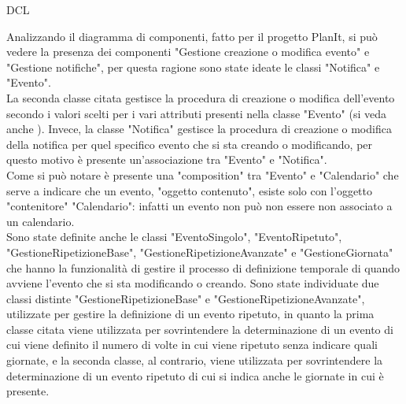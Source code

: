 \begin{listaPersonale}{DCL}
\begin{listaPersonale2}[DCL]{}
        \begin{center}
            
        \end{center}


        Analizzando il diagramma di componenti, fatto per il progetto PlanIt, si può vedere la presenza dei componenti "Gestione creazione o modifica evento" e "Gestione notifiche", per questa ragione sono state ideate le classi "Notifica" e "Evento". \\
        La seconda classe citata gestisce la procedura di creazione o modifica dell'evento secondo i valori scelti per i vari attributi presenti nella classe "Evento" (si veda anche ). Invece, la classe "Notifica" gestisce la procedura di creazione o modifica della notifica per quel specifico evento che si sta creando o modificando, per questo motivo è presente un'associazione tra "Evento" e "Notifica".\\
        Come si può notare è presente una "composition" tra "Evento" e "Calendario" che serve a indicare che un evento, "oggetto contenuto", esiste solo con l'oggetto "contenitore" "Calendario": infatti un evento non può non essere non associato a un calendario.\\
        Sono state definite anche le classi "EventoSingolo", "EventoRipetuto", "GestioneRipetizioneBase", "GestioneRipetizioneAvanzate" e "GestioneGiornata" che hanno la funzionalità di gestire il processo di definizione temporale di quando avviene l'evento che si sta modificando o creando. Sono state individuate due classi distinte "GestioneRipetizioneBase" e "GestioneRipetizioneAvanzate", utilizzate per gestire la definizione di un evento ripetuto, in quanto la prima classe citata viene utilizzata per sovrintendere la determinazione di un evento di cui viene definito il numero di volte in cui viene ripetuto senza indicare quali giornate, e la seconda classe, al contrario, viene utilizzata per sovrintendere la determinazione di un evento ripetuto di cui si indica anche le giornate in cui è presente. \\

\end{listaPersonale2}
\end{listaPersonale}
